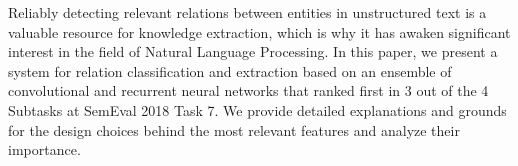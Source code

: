 Reliably detecting relevant relations between entities in unstructured text is a valuable resource for knowledge extraction, which is why it has awaken significant interest in the field of Natural Language Processing. In this paper, we present a system for relation classification and extraction based on an ensemble of convolutional and recurrent neural networks that ranked first in 3 out of the 4 Subtasks at SemEval 2018 Task 7. We provide detailed explanations and grounds for the design choices behind the most relevant features and analyze their importance.
